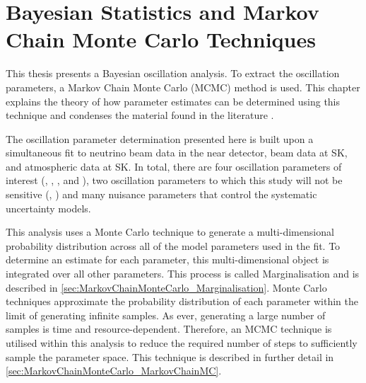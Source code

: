 \chapter{Bayesian Statistics and Markov Chain Monte Carlo Techniques}
\label{chap:MarkovChainMonteCarlo}
This thesis presents a Bayesian oscillation analysis. To extract the oscillation parameters, a Markov Chain Monte Carlo (MCMC) method is used. This chapter explains the theory of how parameter estimates can be determined using this technique and condenses the material found in the literature \cite{mcmc_handbook, mcmc_practice, thesis_clarence, thesis_kirsty}.

The oscillation parameter determination presented here is built upon a simultaneous fit to neutrino beam data in the near detector, beam data at SK, and atmospheric data at SK. In total, there are four oscillation parameters of interest (, , , and ), two oscillation parameters to which this study will not be sensitive (, ) and  many nuisance parameters that control the systematic uncertainty models.

This analysis uses a Monte Carlo technique to generate a multi-dimensional probability distribution across all of the model parameters used in the fit. To determine an estimate for each parameter, this multi-dimensional object is integrated over all other parameters. This process is called Marginalisation and is described in \autoref{sec:MarkovChainMonteCarlo_Marginalisation}. Monte Carlo techniques approximate the probability distribution of each parameter within the limit of generating infinite samples. As ever, generating a large number of samples is time and resource-dependent. Therefore, an MCMC technique is utilised within this analysis to reduce the required number of steps to sufficiently sample the parameter space. This technique is described in further detail in \autoref{sec:MarkovChainMonteCarlo_MarkovChainMC}.

